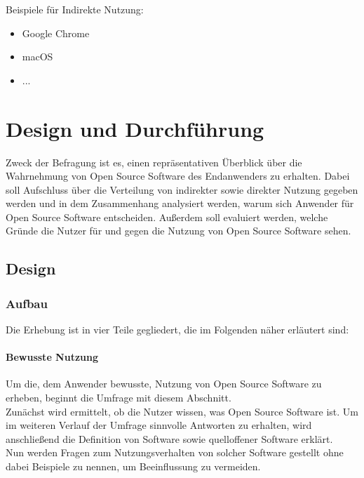 \documentclass[a4paper]{article}
\begin{document}
                    Beispiele für Indirekte Nutzung:
                    \begin{itemize}
                        \item Google Chrome %
                        \item macOS %
                        \item ... %
                    \end{itemize}

            
        
    \section{Design und Durchführung}
		Zweck der Befragung ist es, einen repräsentativen Überblick über die Wahrnehmung von Open Source Software des Endanwenders zu erhalten. Dabei soll Aufschluss über die Verteilung von indirekter sowie direkter Nutzung gegeben werden und in dem Zusammenhang analysiert werden, warum sich Anwender für Open Source Software entscheiden. Außerdem soll evaluiert werden, welche Gründe die Nutzer für und gegen die Nutzung von Open Source Software sehen.
	
		\subsection{Design}
		  \subsubsection{Aufbau}
    			Die Erhebung ist in vier Teile gegliedert, die im Folgenden näher erläutert sind: 
    		   
    			\paragraph{Bewusste Nutzung}
    				Um die, dem Anwender bewusste, Nutzung von Open Source Software zu erheben, beginnt die Umfrage mit diesem Abschnitt.\\
    				Zunächst wird ermittelt, ob die Nutzer wissen, was Open Source Software ist. Um im weiteren Verlauf der Umfrage sinnvolle Antworten zu erhalten, wird anschließend die Definition von Software sowie quelloffener Software erklärt.\\
    				Nun werden Fragen zum Nutzungsverhalten von solcher Software gestellt ohne dabei Beispiele zu nennen, um Beeinflussung zu vermeiden.
    			
\end{document}
